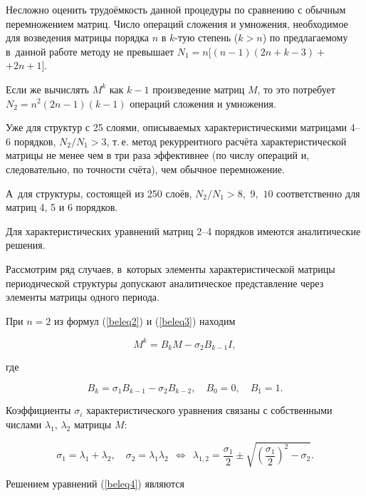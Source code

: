 Несложно оценить трудоёмкость данной процедуры по сравнению с обычным перемножением матриц. Число операций сложения и умножения, необходимое для возведения матрицы  порядка $n$ в $k$-тую степень ($k>n$) по предлагаемому в~данной работе методу не превышает \mbox{$N_1=n[(n-1)(2n+k-3)+$} $+2n+1]$. 

Если же вычислять $M^k$ как $k-1$ произведение  матриц $M$, то это потребует $N_2=n^2(2n-1)(k-1)$ операций сложения и умножения.



Уже для структур с 25 слоями, описываемых характеристическими матрицами 4--6 порядков, ${N_2}/{N_1}>3$, т.\,е.  метод рекуррентного расчёта характеристической матрицы не менее чем в три раза эффективнее (по числу операций и, следовательно, по точности счёта), чем обычное перемножение. 

А~для структуры, состоящей из 250 слоёв,  ${N_2}/{N_1}>8,$ $9,$ $10$ соответственно для матриц  4, 5 и 6 порядков.

 

Для характеристических уравнений матриц 2--4 порядков имеются аналитические решения. 

Рассмотрим ряд случаев, в~которых элементы характеристической матрицы периодической структуры допускают аналитическое представление через элементы матрицы одного периода.



\smallskip




 При $n=2$ из формул (\ref{beleq2}) и (\ref{beleq3}) находим

$$M^k=B_kM-\sigma_2B_{k-1}I,$$

где

\begin{equation}

 B_k=\sigma_1B_{k-1}-\sigma_2B_{k-2},\quad 	B_0=0,\quad B_1=1. \label{beleq4}

\end{equation}

Коэффициенты  $\sigma_i$ характеристического уравнения связаны с собственными числами  $\lambda_1$, $\lambda_2$   матрицы  $M$:

$$\sigma_1=\lambda_1+\lambda_2,\quad  \sigma_2=\lambda_1\lambda_2 \ \ \Longleftrightarrow\ \ \lambda_{1,2}=\frac{\sigma_1}{2}\pm\sqrt{\left(\frac{\sigma_1}{2}\right)^2-\sigma_2}.$$

Решением уравнений (\ref{beleq4}) являются

